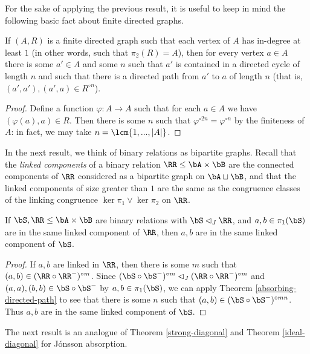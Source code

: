 For the sake of applying the previous result, it is useful to keep in mind the following basic fact about finite directed graphs.

\begin{prop} If $(A,R)$ is a finite directed graph such that each vertex of $A$ has in-degree at least $1$ (in other words, such that $\pi_2(R) = A$), then for every vertex $a \in A$ there is some $a' \in A$ and some $n$ such that $a'$ is contained in a directed cycle of length $n$ and such that there is a directed path from $a'$ to $a$ of length $n$ (that is, $(a',a'), (a',a) \in R^{\circ n}$).
\end{prop}
\begin{proof} Define a function $\varphi : A \rightarrow A$ such that for each $a \in A$ we have $(\varphi(a),a) \in R$. Then there is some $n$ such that $\varphi^{\circ 2n} = \varphi^{\circ n}$ by the finiteness of $A$: in fact, we may take $n = \lcm\{1, ..., |A|\}$.
\end{proof}

In the next result, we think of binary relations as bipartite graphs. Recall that the \emph{linked components} of a binary relation $\RR \le \bA \times \bB$ are the connected components of $\RR$ considered as a bipartite graph on $\bA \sqcup \bB$, and that the linked components of size greater than $1$ are the same as the congruence classes of the linking congruence $\ker \pi_1 \vee \ker \pi_2$ on $\RR$.

\begin{thm}\label{absorbing-linked} If $\bS, \RR \le \bA \times \bB$ are binary relations with $\bS \lhd_J \RR$, and $a,b \in \pi_1(\bS)$ are in the same linked component of $\RR$, then $a,b$ are in the same linked component of $\bS$.
\end{thm}
\begin{proof} If $a,b$ are linked in $\RR$, then there is some $m$ such that $(a,b) \in (\RR \circ \RR^{-})^{\circ m}$. Since $(\bS \circ \bS^{-})^{\circ m} \lhd_J (\RR \circ \RR^{-})^{\circ m}$ and $(a,a), (b,b) \in \bS \circ \bS^-$ by $a,b \in \pi_1(\bS)$, we can apply Theorem \ref{absorbing-directed-path} to see that there is some $n$ such that $(a,b) \in (\bS \circ \bS^{-})^{\circ mn}$. Thus $a,b$ are in the same linked component of $\bS$.
\end{proof}

The next result is an analogue of Theorem \ref{strong-diagonal} and Theorem \ref{ideal-diagonal} for J\'onsson absorption.

